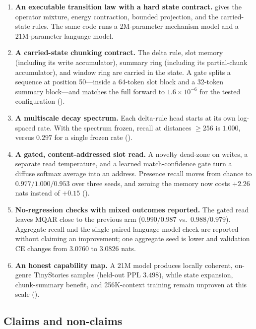 \begin{enumerate}[leftmargin=1.2em]
\item \textbf{An executable transition law with a hard state contract.}
       gives the operator mixture, energy contraction, bounded projection,
      and the carried-state rules. The same code runs a 2M-parameter mechanism model
      and a 21M-parameter language model.
\item \textbf{A carried-state chunking contract.}
      The delta rule, slot memory (including its write accumulator), summary ring (including its
      partial-chunk accumulator), and window ring are carried in the state. A gate splits a
      sequence at position 50---inside a 64-token slot block and a 32-token summary block---and
      matches the full forward to $1.6\times10^{-6}$ for the tested configuration
      ().
\item \textbf{A multiscale decay spectrum.}
      Each delta-rule head starts at its own log-spaced rate. With the spectrum frozen, recall
      at distances $\geq256$ is $1.000$, versus $0.297$ for a single frozen rate
      ().
\item \textbf{A gated, content-addressed slot read.}
      A novelty dead-zone on writes, a separate read temperature, and a learned
      match-confidence gate turn a diffuse softmax average into an address. Presence recall
      moves from chance to $0.977/1.000/0.953$ over three seeds, and zeroing the memory now
      costs $+2.26$ nats instead of $+0.15$ ().
\item \textbf{No-regression checks with mixed outcomes reported.}
      The gated read leaves MQAR close to the previous arm ($0.990/0.987$ vs.\ $0.988/0.979$).
      Aggregate recall and the single paired language-model check are reported without claiming
      an improvement; one aggregate seed is lower and validation CE changes from $3.0760$ to
      $3.0826$ nats.
\item \textbf{An honest capability map.}
      A 21M model produces locally coherent, on-genre TinyStories samples (held-out PPL
      $3.498$), while state
      expansion, chunk-summary benefit, and 256K-context training remain unproven at this
      scale ().
\end{enumerate}

\subsection{Claims and non-claims}

